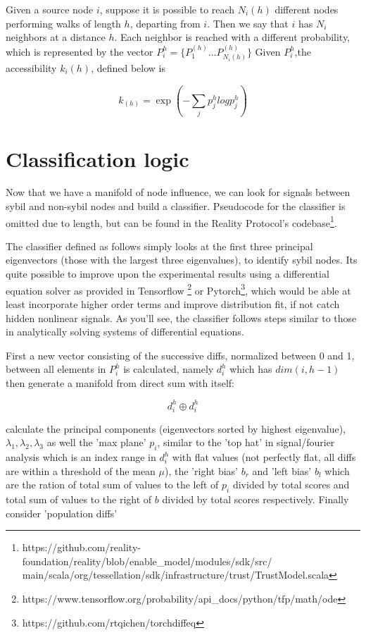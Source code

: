 \documentclass{article}
\begin{document}
Given a source node $i$, suppose it is possible to reach $N_i(h)$ different nodes performing walks of length $h$, departing from $i$. Then we say that $i$ has $N_i$ neighbors at a distance $h$. Each neighbor is reached with a different probability, which is represented by the vector $P_i^h = \{ P_1^{(h)} \dots P_{N_i(h)}^{(h)} \}$ Given $P_i^h$,the accessibility $k_i(h)$, defined below is 
	
	
\begin{equation}
k_(h) = \exp (-\sum_j p^{h}_j log p^{h}_j )
\end{equation}

\section{Classification logic}
Now  that we have a manifold of node influence, we can look for signals between sybil and non-sybil nodes and build a classifier. Pseudocode for the classifier is omitted due to length, but can be found in the Reality Protocol's codebase\footnote{https://github.com/reality-foundation/reality/blob/enable\_model/modules/sdk/src/\\main/scala/org/tessellation/sdk/infrastructure/trust/TrustModel.scala}.

The classifier defined as follows simply looks at the first three principal eigenvectors (those with the largest three eigenvalues), to identify sybil nodes. Its quite possible to improve upon the experimental results using a differential equation solver as provided in Tensorflow \footnote{https://www.tensorflow.org/probability/api\_docs/python/tfp/math/ode} or Pytorch\footnote{https://github.com/rtqichen/torchdiffeq}, which would be able at least incorporate higher order terms and improve distribution fit, if not catch hidden nonlinear signals. As you'll see, the classifier follows steps similar to those in analytically solving systems of differential equations.

First a new vector consisting of the successive diffs, normalized between 0 and 1, between all elements in $P_i^h$ is calculated, namely $d_i^h$ which has $dim(i, h-1)$ then generate a manifold from direct sum with itself:

\begin{equation}
d_i^h \oplus d_i^h
\end{equation}

calculate the principal components (eigenvectors sorted by highest eigenvalue), $\lambda_1, \lambda_2 ,\lambda_3$ as well the 'max plane' $p_i$, similar to the 'top hat' in signal/fourier analysis which is an index range in $d_i^h$ with flat values (not perfectly flat, all diffs are within a threshold of the mean $\mu$), the 'right bias' $b_r$ and 'left bias' $b_l$ which are the ration of total sum of values to the left of $p_i$ divided by total scores and  total sum of values to the right of $b$ divided by total scores respectively. Finally consider 'population diffs' 
\end{document}
